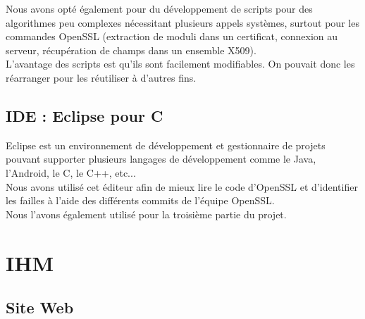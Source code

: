 Nous avons opté également pour du développement de scripts pour des algorithmes peu complexes nécessitant plusieurs appels systèmes, surtout pour les commandes OpenSSL (extraction de moduli dans un certificat, connexion au serveur, récupération de champs dans un ensemble X509).\\
L'avantage des scripts est qu'ils sont facilement modifiables. On pouvait donc les réarranger pour les réutiliser à d'autres fins.

\subsection{IDE : Eclipse pour C}

Eclipse est un environnement de développement et gestionnaire de projets pouvant supporter plusieurs langages de développement comme le Java, l'Android, le C, le C++, etc...\\
Nous avons utilisé cet éditeur afin de mieux lire le code d'OpenSSL et d'identifier les failles à l'aide des différents commits de l'équipe OpenSSL.\\

Nous l'avons également utilisé pour la troisième partie du projet.

\section{IHM}

\subsection{Site Web}

